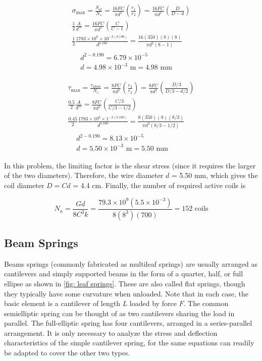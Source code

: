 \documentclass[a4paper,openany,nobib]{tufte-book}
\begin{document}
{{$$\begin{gathered}
  \sigma_{\max} = \frac{S_{ut}}{N_s} = \frac{16FC}{\pi d^2}\left( \frac{r_1}{r_3} \right) = \frac{16FC}{\pi d^2}\left( \frac{D}{D - d} \right) \\
  \frac{1}{2}\frac{A}{d^m} = \frac{16FC}{\pi d^2}\left( \frac{C}{C - 1} \right) \\ 
  \frac{1}{2}\frac{1783 \times 10^6 \times 10^{-3(0.190)}}{d^{0.190}} = \frac{16(350)(8)(8)}{\pi d^2(8 - 1)} \\
  \begin{aligned}
  &d^{2 - 0.190} = 6.79 \times 10^{-5} \\ 
  &d = 4.98 \times 10^{-3}\text{ m} = 4.98\text{ mm}
  \end{aligned}\end{gathered}$$

$$\begin{gathered}
  \tau_{\max} = \frac{\tau_{allow}}{N_s} = \frac{8FC}{\pi d^2}\left( \frac{r_4}{r_2} \right) = \frac{8FC}{\pi d^2}\left( \frac{D/3}{D/3 - d/2} \right) \\ 
  \frac{0.5}{2}\frac{A}{d^m} = \frac{8FC}{\pi d^2}\left( \frac{C/3}{C/3 - 1/2} \right) \\ 
  \frac{0.45}{2}\frac{1783 \times 10^6 \times 1^{-3(0.190)}}{d^{0.190}} = \frac{8(350)(8)(8/3)}{\pi d^2(8/3 - 1/2)} \\
  \begin{aligned}
  &d^{2 - 0.190} = 8.13 \times 10^{-5} \\ 
  &d = 5.50 \times 10^{-3}\text{ m} = 5.50 \text{ mm}
  \end{aligned}\end{gathered}$$

In this problem, the limiting factor is the shear stress (since it
requires the larger of the two diameters). Therefore, the wire diameter
\(d\) = 5.50 mm, which gives the coil diameter \(D = Cd\) = 4.4 cm. Finally,
the number of required active coils is

$$N_a = \frac{Gd}{8C^3k} = \frac{79.3 \times 10^9(5.5 \times 10^{-3})}{8(8^3)(700)} = 152\text{ coils}$$

\subsection{Beam Springs}
\label{beam-springs}
Beams springs (commonly fabricated as multileaf springs) are usually
arranged as cantilevers and simply supported beams in the form of a
quarter, half, or full ellipse as shown in
\ref{fig: leaf springs}. These are also called flat
springs, though they typically have some curvature when unloaded. Note
that in each case, the basic element is a cantilever of length \(L\)
loaded by force \(F\). The common semielliptic spring can be thought of as
two cantilevers sharing the load in parallel. The full-elliptic spring
has four cantilevers, arranged in a series-parallel arrangement. It is
only necessary to analyze the stress and deflection characteristics of
the simple cantilever spring, for the same equations can readily be
adapted to cover the other two types.

}}
\end{document}

